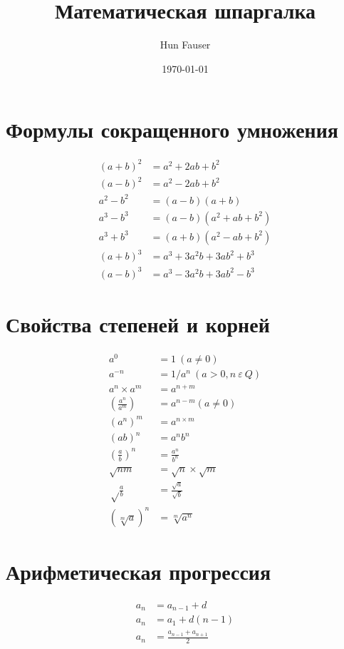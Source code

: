 \documentclass[a4paper,12pt]{article}
\author{Hun Fauser}
\title{Математическая шпаргалка}
\date{\today}
\begin{document}

\maketitle

\section{Формулы сокращенного умножения}

\begin{align*}
(a + b)^2 &= a^2 + 2ab + b^2 \\
(a - b)^2 &= a^2 - 2ab + b^2 \\
a^2 - b^2 &= (a - b)(a + b) \\
a^3 - b^3 &= (a - b)(a^2 + ab + b^2) \\
a^3 + b^3 &= (a + b)(a^2 - ab + b^2) \\
(a + b)^3 &= a^3 + 3a^2b + 3ab^2 + b^3 \\
(a - b)^3 &= a^3 - 3a^2b + 3ab^2 - b^3
\end{align*}

\section{Свойства степеней и корней}

\begin{align*}
a^0 &= 1 ~(a \ne 0) \\
a^{-n} &= 1/a^n ~(a > 0, n ~\varepsilon ~Q) \\
a^n \times a^m &= a^{n + m} \\
\left(\frac{a^n}{a^m}\right) &= a^{n - m} (a \ne 0) \\
(a^n)^m &= a^{n \times m} \\
(ab)^n &= a^nb^n \\
\left(\frac{a}{b}\right)^n &= \frac{a^n}{b^n} \\
\sqrt{nm} &= \sqrt{n} \times \sqrt{m} \\
\sqrt\frac{a}{b} &= \frac{\sqrt{a}}{\sqrt{b}} \\
\left( \sqrt[m]a \right)^n &= \sqrt[m]{a^n}
\end{align*}

\section{Арифметическая прогрессия}

\begin{align*}
a_{n} &= a_{n-1} + d \\
a_{n} &= a_{1} + d(n - 1) \\
a_{n} &= \frac{a_{n - 1} + a_{n + 1}}{2} 
\end{align*}
\end{document}
